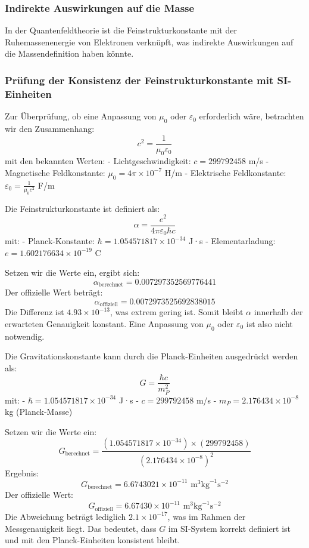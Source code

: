 \documentclass{article}
\begin{document}
	\subsubsection{Indirekte Auswirkungen auf die Masse}
	In der Quantenfeldtheorie ist die Feinstrukturkonstante mit der Ruhemassenenergie von Elektronen verknüpft, was indirekte Auswirkungen auf die Massendefinition haben könnte.
\subsubsection{Prüfung der Konsistenz der Feinstrukturkonstante mit SI-Einheiten}

	
	Zur Überprüfung, ob eine Anpassung von \( \mu_0 \) oder \( \varepsilon_0 \) erforderlich wäre, betrachten wir den Zusammenhang:
	\[
	c^2 = \frac{1}{\mu_0 \varepsilon_0}
	\]
	mit den bekannten Werten:
	- Lichtgeschwindigkeit: \( c = 299792458 \) m/s
	- Magnetische Feldkonstante: \( \mu_0 = 4\pi \times 10^{-7} \) H/m
	- Elektrische Feldkonstante: \( \varepsilon_0 = \frac{1}{\mu_0 c^2} \) F/m
	
	Die Feinstrukturkonstante ist definiert als:
	\[
	\alpha = \frac{e^2}{4\pi \varepsilon_0 \hbar c}
	\]
	mit:
	- Planck-Konstante: \( \hbar = 1.054571817 \times 10^{-34} \) J·s
	- Elementarladung: \( e = 1.602176634 \times 10^{-19} \) C
	
	Setzen wir die Werte ein, ergibt sich:
	\[
	\alpha_{\text{berechnet}} = 0.007297352569776441
	\]
	Der offizielle Wert beträgt:
	\[
	\alpha_{\text{offiziell}} = 0.0072973525692838015
	\]
	Die Differenz ist \( 4.93 \times 10^{-13} \), was extrem gering ist. Somit bleibt \( \alpha \) innerhalb der erwarteten Genauigkeit konstant. Eine Anpassung von \( \mu_0 \) oder \( \varepsilon_0 \) ist also nicht notwendig.
	
	Die Gravitationskonstante kann durch die Planck-Einheiten ausgedrückt werden als:
	\[
	G = \frac{\hbar c}{m_P^2}
	\]
	mit:
	- \( \hbar = 1.054571817 \times 10^{-34} \) J·s
	- \( c = 299792458 \) m/s
	- \( m_P = 2.176434 \times 10^{-8} \) kg (Planck-Masse)
	
	Setzen wir die Werte ein:
	\[
	G_{\text{berechnet}} = \frac{(1.054571817 \times 10^{-34}) \times (299792458)}{(2.176434 \times 10^{-8})^2}
	\]
	Ergebnis:
	\[
	G_{\text{berechnet}} = 6.6743021 \times 10^{-11} \text{ m}^3\text{kg}^{-1}\text{s}^{-2}
	\]
	Der offizielle Wert:
	\[
	G_{\text{offiziell}} = 6.67430 \times 10^{-11} \text{ m}^3\text{kg}^{-1}\text{s}^{-2}
	\]
	Die Abweichung beträgt lediglich \( 2.1 \times 10^{-17} \), was im Rahmen der Messgenauigkeit liegt. Das bedeutet, dass \( G \) im SI-System korrekt definiert ist und mit den Planck-Einheiten konsistent bleibt.
	
\end{document}
